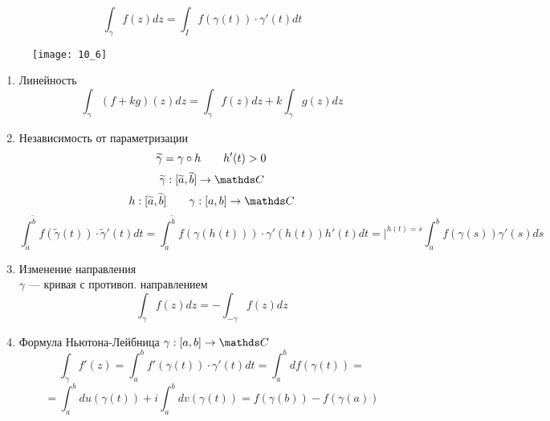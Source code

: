 \documentclass[main]{subfiles}
\begin{document}
    \begin{Definition}
        \[\int_\gamma f(z)dz = \int_I f(\gamma(t)) \cdot \gamma'(t)dt\]
        \begin{figure}[H]
            \centering
            \texttt{[image: 10\_6]}
        \end{figure}
    \end{Definition}

    \begin{properties}
        \begin{enumerate}
            \item Линейность
                  \[\int_\gamma (f + kg)(z)dz = \int_\gamma f(z)dz + k\int_\gamma g(z)dz \]
            \item Независимость от параметризации
                  \[\widetilde{\gamma} = \gamma \circ h \qquad h'(t) > 0\]
                  \[\widetilde{\gamma} : [\widetilde{a}, \widetilde{b}] \to \CC\]
                  \[h : [\widetilde{a}, \widetilde{b}] \qq \gamma: [a, b] \to \CC\]
                  \[\int_{\widetilde{a}}^{\widetilde{b}} f(
                      \widetilde{\gamma}(t)) \cdot \widetilde{\gamma}'(t)dt =
                      \int_{\widetilde{a}}^{\widetilde{b}} f(\gamma(h(t))) \cdot \gamma'(h(t))
                      h'(t) dt = \bigg|^{h(t) = s}  \int_a^b f(\gamma(s))\gamma'(s)ds\]
            \item Изменение направления \\
                  $\gamma$ --- кривая с противоп. направлением
                  \[\int_\gamma f(z)dz = -\int_{-\gamma} f(z)dz \]
            \item Формула Ньютона-Лейбница \qq $\gamma: [a, b] \to \CC$
                  \[\int_\gamma f'(z) = \int_a^b f'(\gamma(t)) \cdot \gamma'(t)dt =
                      \int_a^b df(\gamma(t)) = \]
                  \[= \int_a^b du(\gamma(t)) + i\int_a^b dv(\gamma(t)) =
                      f(\gamma(b)) - f(\gamma(a))\]
        \end{enumerate}
    \end{properties}
\end{document}
